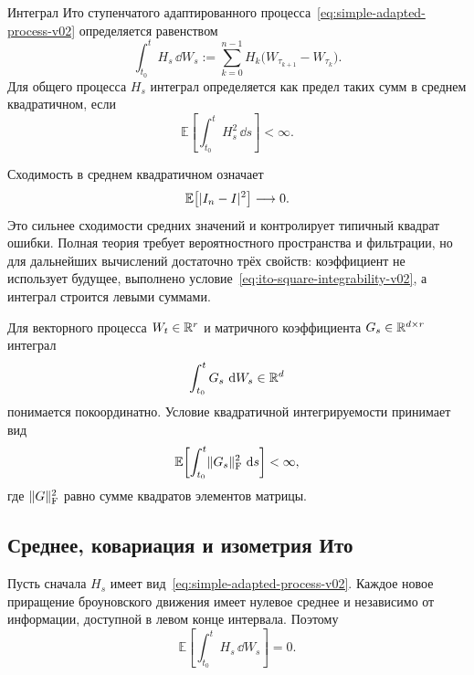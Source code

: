 \begin{definition}
Интеграл Ито ступенчатого адаптированного процесса~\eqref{eq:simple-adapted-process-v02} определяется равенством
\begin{equation}
\label{eq:ito-integral-simple-v02}
\int_{t_0}^{t} H_s\,\dd W_s
:=
\sum_{k=0}^{n-1}
H_k
\bigl(W_{\tau_{k+1}}-W_{\tau_k}\bigr).
\end{equation}
Для общего процесса $H_s$ интеграл определяется как предел таких сумм в среднем квадратичном, если
\begin{equation}
\label{eq:ito-square-integrability-v02}
\mathbb E\!\left[
\int_{t_0}^{t} H_s^2\,\dd s
\right]<\infty.
\end{equation}
\end{definition}

Сходимость в среднем квадратичном означает
\[
\mathbb E\!
\left[
\lvert I_n-I\rvert^2
\right]
\longrightarrow0.
\]
Это сильнее сходимости средних значений и контролирует типичный квадрат ошибки. Полная теория требует вероятностного пространства и фильтрации, но для дальнейших вычислений достаточно трёх свойств: коэффициент не использует будущее, выполнено условие~\eqref{eq:ito-square-integrability-v02}, а интеграл строится левыми суммами.

Для векторного процесса $W_t\in\mathbb{R}^r$ и матричного коэффициента $G_s\in\mathbb{R}^{d\times r}$ интеграл
\begin{equation}
\label{eq:ito-integral-matrix-v02}
\int_{t_0}^{t}G_s\,\mathop{}\!\mathrm{d} W_s
\in\mathbb{R}^d
\end{equation}
понимается покоординатно. Условие квадратичной интегрируемости принимает вид
\begin{equation}
\label{eq:ito-matrix-integrability-v02}
\mathbb E\!\left[
\int_{t_0}^{t}\lVert G_s\rVert_{\mathrm F}^2\,\mathop{}\!\mathrm{d} s
\right]<\infty,
\end{equation}
где $\lVert G\rVert_{\mathrm F}^2$ равно сумме квадратов элементов матрицы.

\subsection{Среднее, ковариация и изометрия Ито}

Пусть сначала $H_s$ имеет вид~\eqref{eq:simple-adapted-process-v02}. Каждое новое приращение броуновского движения имеет нулевое среднее и независимо от информации, доступной в левом конце интервала. Поэтому
\begin{equation}
\label{eq:ito-integral-zero-mean-v02}
\mathbb E\!\left[
\int_{t_0}^{t}H_s\,\dd W_s
\right]=0.
\end{equation}

